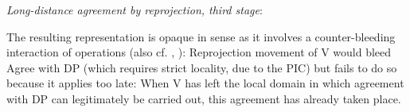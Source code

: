 \documentclass[output=paper
,modfonts
,nonflat]{langsci/langscibook}
\begin{document}
	\begin{exe} 
		\ex	\label{ex:mueller:34}\label{Baum3}\textit{Long-distance agreement by reprojection, third stage}:\\
	\end{exe} 
    \noindent The resulting representation is opaque in 
	sense as it involves a counter-bleeding interaction of operations
	(also cf.  \citealt{Chomsky:51}, \citealt[25--26]{Chomsky:75:the}):
	Reprojection movement of V would bleed Agree with DP
	(which requires strict locality, due to the PIC) but fails to do so
	because it applies too late: When V has left the local domain in
	which agreement  with DP can legitimately be carried out, this
	agreement has already taken place.\largerpage[-3] 
	
\end{document}
